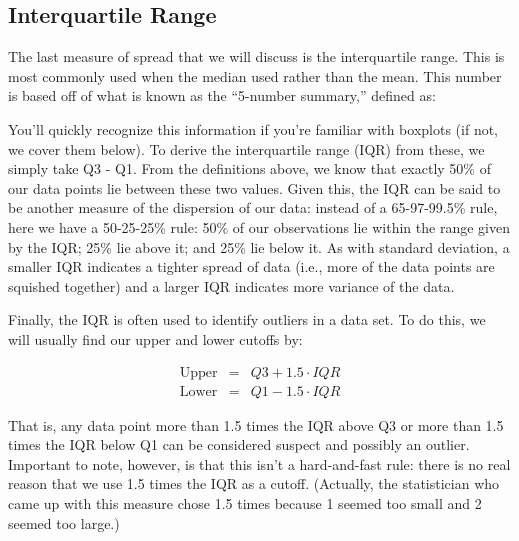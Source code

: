 \subsection{Interquartile Range}
The last measure of spread that we will discuss is the interquartile range. This is most commonly used when the median used rather than the mean. This number is based off of what is known as the ``5-number summary,'' defined as:

\begin{glossary}
\term{}{}
\end{glossary}

You'll quickly recognize this information if you're familiar with boxplots (if not, we cover them below). To derive the interquartile range (IQR) from these, we simply take Q3 - Q1. From the definitions above, we know that exactly 50\% of our data points lie between these two values. Given this, the IQR can be said to be another measure of the dispersion of our data: instead of a 65-97-99.5\% rule, here we have a 50-25-25\% rule: 50\% of our observations lie within the range given by the IQR; 25\% lie above it; and 25\% lie below it. As with standard deviation, a smaller IQR indicates a tighter spread of data (i.e., more of the data points are squished together) and a larger IQR indicates more variance of the data.

Finally, the IQR is often used to identify outliers in a data set. To do this, we will usually find our upper and lower cutoffs by:

\begin{eqnarray*}
    \text{Upper} &=& Q3+1.5\cdot IQR \\
    \text{Lower} &=& Q1-1.5\cdot IQR
\end{eqnarray*}

That is, any data point more than 1.5 times the IQR above Q3 or more than 1.5 times the IQR below Q1 can be considered suspect and possibly an outlier. Important to note, however, is that this isn't a hard-and-fast rule: there is no real reason that we use 1.5 times the IQR as a cutoff. (Actually, the statistician who came up with this measure chose 1.5 times because 1 seemed too small and 2 seemed too large.)

